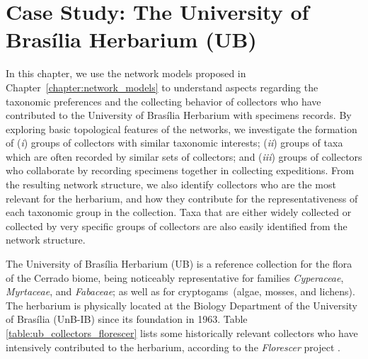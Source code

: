 \chapter{Case Study: The University of Brasília Herbarium (UB)}\label{casestudy_ub}


In this chapter, we use the network models proposed in Chapter~\ref{chapter:network_models} to understand aspects regarding the taxonomic preferences and the collecting behavior of collectors who have contributed to the University of Brasília Herbarium with specimens records.
By exploring basic topological features of the networks, we investigate the formation of
(\textit{i}) groups of collectors with similar taxonomic interests;
(\textit{ii}) groups of taxa which are often recorded by similar sets of collectors; and
(\textit{iii}) groups of collectors who collaborate by recording specimens together in collecting expeditions. 
From the resulting network structure, we also identify collectors who are the most relevant for the herbarium, and how they contribute for the representativeness of each taxonomic group in the collection.
Taxa that are either widely collected or collected by very specific groups of collectors are also easily identified from the network structure.

The University of Brasília Herbarium (UB) is a reference collection for the flora of the Cerrado biome, being noticeably representative for families \textit{Cyperaceae}, \textit{Myrtaceae}, and \textit{Fabaceae}; as well as for cryptogams~(algae, mosses, and lichens).
%
The herbarium is physically located at the Biology Department of the University of Brasília (UnB-IB) since its foundation in 1963.
Table \ref{table:ub_collectors_florescer} lists some historically relevant collectors who have intensively contributed to the herbarium, according to the \textit{Florescer} project \cite{florescer}.

